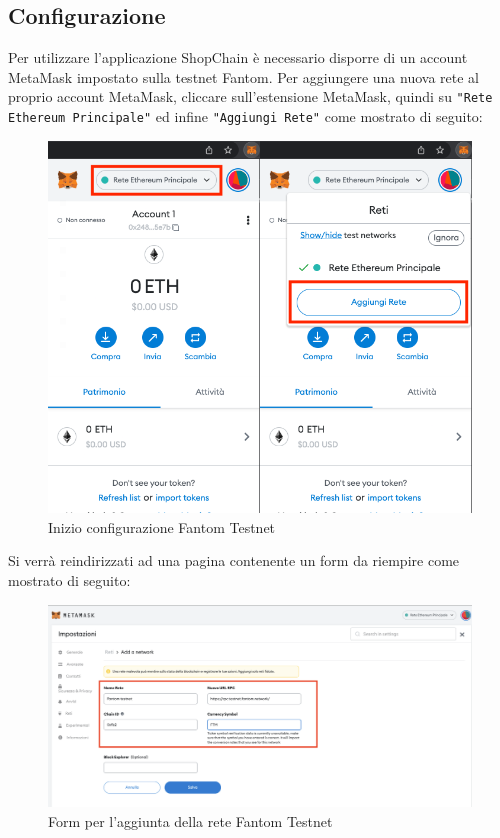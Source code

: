 \subsection{Configurazione}

Per utilizzare l'applicazione ShopChain è necessario disporre di un account MetaMask impostato sulla testnet Fantom.
Per aggiungere una nuova rete al proprio account MetaMask, cliccare sull'estensione MetaMask, quindi su \texttt{"Rete Ethereum Principale"}  ed infine \texttt{"Aggiungi Rete"} come mostrato di seguito:
\begin{figure}[H]
    \centering
    \includegraphics[scale=0.4]{immagini/Configuration.png}
    \caption{Inizio configurazione Fantom Testnet}
\end{figure}

Si verrà reindirizzati ad una pagina contenente un form da riempire come mostrato di seguito:

\begin{figure}[H]
    \centering
    \includegraphics[scale=0.3]{immagini/ConfData.png}
    \caption{Form per l'aggiunta della rete Fantom Testnet}
\end{figure} 

